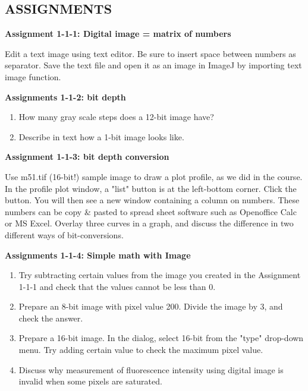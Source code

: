 \clearpage
\subsection{ASSIGNMENTS }%

\textbf{\sffamily
Assignment 1-1-1: Digital image = matrix of numbers}

Edit a text image using text editor. Be sure to insert space between
numbers as separator. Save the text file and open it as an image in
ImageJ by importing text image function. \ \ 

\textbf{\sffamily
Assignments 1-1-2: bit depth}
\begin{enumerate}
\item How many gray scale steps does a 12-bit image have?\\
\item Describe in text how a 1-bit image looks like.
\end{enumerate}

\textbf{\sffamily
Assignment 1-1-3: bit depth conversion}

Use m51.tif (16-bit!) sample image to draw a plot profile, as we did in
the course. In the profile plot window, a
"list" button is at the left-bottom corner.
Click the button. You will then see a new window containing a column on
numbers. These numbers can be copy \& pasted to spread sheet software
such as Openoffice Calc or MS Excel. Overlay three curves in a graph,
and discuss the difference in two different ways of bit-conversions. 

\textbf{\sffamily
Assignments 1-1-4: Simple math with Image}
\begin{enumerate}
\item Try subtracting certain values from the image you created in
the Assignment 1-1-1 and check that the values cannot be less than 0. 
\item Prepare an 8-bit image with pixel value 200. Divide the
image by 3, and check the answer. 

\item Prepare a 16-bit image. In the  dialog, select 16-bit from the
"type" drop-down menu. Try adding
certain value to check the maximum pixel value. 

\item Discuss why measurement of fluorescence intensity using
digital image is invalid when some pixels are saturated. 
\end{enumerate}

